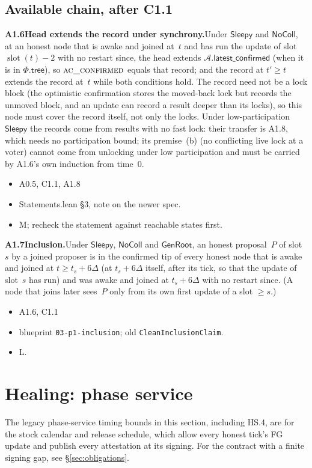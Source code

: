 \documentclass{article}
\newcommand{\slot}{\operatorname{slot}}
\newcommand{\AC}{\mathcal A}
\newcommand{\Fr}{\Phi}
\newcommand{\fname}[1]{\text{\textsc{#1}}}
\newcommand{\latestConfirmed}{\mathsf{latest\_confirmed}}
\newcommand{\dagnode}[6]{%
\par\medskip\noindent\textbf{#1\enspace #2.}\enspace #3
\begin{itemize}[leftmargin=2.2em,itemsep=0pt,topsep=2pt]
\item[\emph{Uses}] #4
\item[\emph{Evid.}] #5
\item[\emph{Task}] #6
\end{itemize}}
\begin{document}
\subsection{Available chain, after C1.1}

\dagnode{A1.6}{Head extends the record under synchrony}{Under $\mathsf{Sleepy}$
and $\mathsf{NoColl}$, at an honest node that is awake and joined at~$t$ and has run the update of
slot $\slot(t)-2$ with no restart since, the head extends $\AC.\latestConfirmed$
(when it is in $\Fr.\mathsf{tree}$), so $\fname{ac\_confirmed}$ equals that
record; and the record at $t'\geq t$ extends the record at~$t$ while both
conditions hold.  The record need not be a lock block (the optimistic
confirmation stores the moved-back lock but records the unmoved block, and an
update can record a result deeper than its locks), so this node must cover the
record itself, not only the locks.  Under low-participation
$\mathsf{Sleepy}$ the records come from results with no fast lock: their
transfer is A1.8, which needs no participation bound; its premise~(b) (no
conflicting live lock at a voter) cannot come from unlocking under low
participation and must be carried by A1.6's own induction from time~$0$.}
{A0.5, C1.1, A1.8}{Statements.lean \S3, note on the newer spec.}{M; recheck the
statement against reachable states first.}

\dagnode{A1.7}{Inclusion}{Under $\mathsf{Sleepy}$, $\mathsf{NoColl}$ and
$\mathsf{GenRoot}$, an honest proposal~$P$ of
slot~$s$ by a joined proposer is in the confirmed tip of every honest node that
is awake and joined at $t\geq t_s+6\Delta$ (at $t_s+6\Delta$ itself, after its
tick, so that the update of slot~$s$ has run) and was awake and joined at
$t_s+6\Delta$ with no restart since.  (A node that joins later sees~$P$ only
from its own first update of a slot $\geq s$.)}
{A1.6, C1.1}{blueprint \texttt{03-p1-inclusion}; old
\texttt{CleanInclusionClaim}.}{L.}

\section{Healing: phase service}\label{sec:healing-service}

The legacy phase-service timing bounds in this section, including HS.4,
are for the stock calendar and release schedule, which allow every honest
tick's FG update and publish every attestation at its signing.
For the contract with a finite signing gap, see \S\ref{sec:obligations}.
\end{document}
